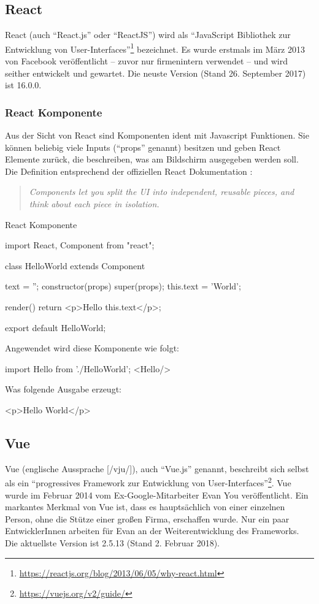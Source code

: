 \subsection{React}
React (auch "`React.js"' oder "`ReactJS"') wird als "`JavaScript Bibliothek zur Entwicklung von User-Interfaces"'\footnote{\url{https://reactjs.org/blog/2013/06/05/why-react.html}} bezeichnet. Es wurde erstmals im März 2013 von Facebook veröffentlicht -- zuvor nur firmenintern verwendet -- und wird seither entwickelt und gewartet. Die neuste Version (Stand 26. September 2017) ist 16.0.0.

\subsubsection{React Komponente}
Aus der Sicht von React sind Komponenten ident mit Javascript Funktionen. Sie können beliebig viele Inputs ("`props"' genannt) besitzen und geben React Elemente zurück, die beschreiben, was am Bildschirm ausgegeben werden soll.
Die Definition entsprechend der offiziellen React Dokumentation \cite{react-component}: 
\begin{quote}
	\begin{english}
		\textit{Components let you split the UI into independent, reusable pieces, and think about each piece in isolation.}
	\end{english}
\end{quote}

\begin{program}[!htbp]
\caption{React Komponente}
\begin{JsCode}
	import React, {Component} from "react";
	
	class HelloWorld extends Component {
		text = '';
		constructor(props) {
			super(props);
			this.text = 'World';
		}
		
		render() {
			return <p>Hello {this.text}</p>;
		}
	}
	export default HelloWorld;
\end{JsCode}
\end{program}
Angewendet wird diese Komponente wie folgt:
\begin{JsCode}[numbers=none]
import Hello from './HelloWorld';
<Hello/>
\end{JsCode}

Was folgende Ausgabe erzeugt:
\begin{JsCode}[numbers=none]
<p>Hello World</p>
\end{JsCode}

\subsection{Vue }
Vue (englische Aussprache [/vju/]), auch "`Vue.js"' genannt, beschreibt sich selbst als ein "`progressives Framework zur Entwicklung von User-Interfaces"'\footnote{\url{https://vuejs.org/v2/guide/}}. Vue wurde im Februar 2014 vom Ex-Google-Mitarbeiter Evan You veröffentlicht. Ein markantes Merkmal von Vue ist, dass es hauptsächlich von einer einzelnen Person, ohne die Stütze einer großen Firma, erschaffen wurde. Nur ein paar EntwicklerInnen arbeiten für Evan an der Weiterentwicklung des Frameworks. Die aktuellste Version ist 2.5.13 (Stand 2. Februar 2018).

